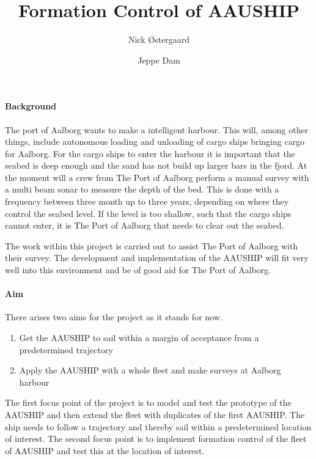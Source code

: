 \documentclass[a4paper,12pt]{article}
\begin{document}
\title{\vspace{-2cm}Formation Control of AAUSHIP}
\author{Nick Østergaard \and Jeppe Dam}
\maketitle


\paragraph{Background}
The port of Aalborg wants to make a intelligent harbour. This will, among other things, include autonomous loading and unloading of cargo ships bringing cargo for Aalborg. For the cargo ships to enter the harbour it is important that the seabed is deep enough and the sand has not build up larger bars in the fjord. At the moment will a crew from The Port of Aalborg perform a manual survey with a multi beam sonar to measure the depth of the bed. This is done with a frequency between three month up to three years, depending on where they control the seabed level. If the level is too shallow, such that the cargo ships cannot enter, it is The Port of Aalborg that needs to clear out the seabed.

The work within this project is carried out to assist The Port of Aalborg with their survey. The development and implementation of the AAUSHIP will fit very well into this environment and be of good aid for The Port of Aalborg.

\paragraph{Aim}
There arises two aims for the project as it stands for now.
\begin{enumerate}
\item Get the AAUSHIP to sail within a margin of acceptance from a predetermined trajectory
\item Apply the AAUSHIP with a whole fleet and make surveys at Aalborg harbour
\end{enumerate}
The first focus point of the project is to model and test the prototype of the AAUSHIP and then extend the fleet with duplicates of the first AAUSHIP. The ship needs to follow a trajectory and thereby sail within a predetermined location of interest. The second focus point is to implement formation control of the fleet of AAUSHIP and test this at the location of interest.
\end{document}

